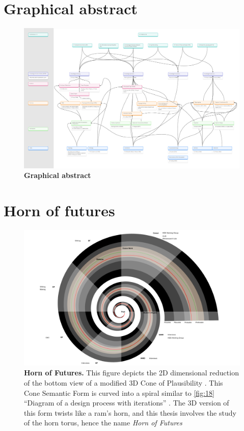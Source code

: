 \section{Graphical abstract}
\begin{figure}[h!]
    \centering
    \includegraphics[width=\textwidth]{figures/AF1.pdf}
    \caption[Graphical abstract]{\textbf{Graphical abstract}}
    \label{fig:graphical_abstract}
 \clearpage
\end{figure}
\clearpage


\section{Horn of futures}
\FloatBarrier
\begin{figure}[h!]
    \centering
    \includegraphics[width=\textwidth]{figures/5.29.png}
    \caption[Horn of Futures]{\textbf{Horn of Futures.} This figure depicts the 2D dimensional reduction of the bottom view of a modified 3D Cone of Plausibility \citep[p. 14]{taylor_creating_1990} \citep[p. 73]{bezold_overview_1993}. This Cone Semantic Form is curved into a spiral similar to \autoref{fig:18} “Diagram of a design process with iterations” \citep[p. 343]{sevaldson_designing_2022} \citep{sevaldson_designing_2022-1}. The 3D version of this form twists like a ram’s horn, and this thesis involves the study of the horn torus, hence the name \textit{Horn of Futures}}
    \label{f5.29}
\end{figure}
\FloatBarrier
\clearpage







